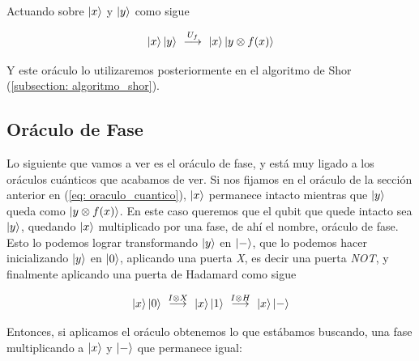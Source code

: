 \documentclass[12pt]{article}
\numberwithin{equation}{section} %
\begin{document}
    \vspace{2.5mm}

    Actuando sobre \( \ket{x} \) y \( \ket{y} \) como sigue

    \begin{equation}
        \ket{x} \ket{y} \ \overset{U_{f}}{\longrightarrow} \ \ket{x} \ket{y \otimes f(x)}
        \label{eq: oraculo_cuantico}
    \end{equation}

    \vspace{2.5mm}

    Y este oráculo lo utilizaremos posteriormente en el algoritmo de Shor (\ref{subsection: algoritmo_shor}).

    \vspace{5mm}





    \subsection{Oráculo de Fase}

    \vspace{5mm}

    Lo siguiente que vamos a ver es el oráculo de fase, y está muy ligado a los oráculos cuánticos que acabamos de ver. Si nos fijamos en el oráculo de la sección anterior en (\ref{eq: oraculo_cuantico}), \( \ket{x} \) permanece intacto mientras que \( \ket{y} \) queda como \( \ket{y \otimes f(x)} \). En este caso queremos que el qubit que quede intacto sea \( \ket{y} \), quedando \( \ket{x} \) multiplicado por una fase, de ahí el nombre, oráculo de fase. Esto lo podemos lograr transformando \( \ket{y} \) en \( \ket{-} \), que lo podemos hacer inicializando \( \ket{y} \) en \( \ket{0} \), aplicando una puerta \textit{X}, es decir una puerta \textit{NOT}, y finalmente aplicando una puerta de Hadamard como sigue

    \begin{equation*}
        \ket{x} \ket{0} \ \overset{I \otimes X}{\longrightarrow} \ \ket{x} \ket{1} \ \overset{I \otimes H}{\longrightarrow} \ \ket{x} \ket{-}
    \end{equation*}

    \vspace{2.5mm}

    Entonces, si aplicamos el oráculo obtenemos lo que estábamos buscando, una fase multiplicando a \( \ket{x} \) y \( \ket{-} \) que permanece igual:
\end{document}
